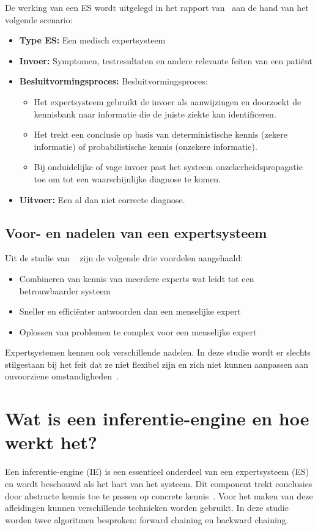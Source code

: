 De werking van een ES wordt uitgelegd in het rapport van~\textcite{Castillo2012} aan de hand van het volgende scenario:
\begin{itemize}
    \item \textbf{Type ES:} Een medisch expertsysteem
    \item \textbf{Invoer:} Symptomen, testresultaten en andere relevante feiten van een patiënt
    \item \textbf{Besluitvormingsproces:}
    {Besluitvormingsproces:}
    \begin{itemize}
        \item Het expertsysteem gebruikt de invoer als aanwijzingen en doorzoekt de kennisbank naar informatie die de juiste ziekte kan identificeren.
        \item Het trekt een conclusie op basis van deterministische kennis (zekere informatie) of probabilistische kennis (onzekere informatie).
        \item Bij onduidelijke of vage invoer past het systeem onzekerheidspropagatie toe om tot een waarschijnlijke diagnose te komen.
        \end{itemize}
    \item \textbf{Uitvoer:} Een al dan niet correcte diagnose.
\end{itemize}

\subsection{Voor- en nadelen van een expertsysteem}
Uit de studie van ~\textcite{Castillo2012} zijn de volgende drie voordelen aangehaald:
\begin{itemize}
    \item {Combineren van kennis van meerdere experts wat leidt tot een betrouwbaarder systeem}
    \item {Sneller en efficiënter antwoorden dan een menselijke expert}
    \item {Oplossen van problemen te complex voor een menselijke expert}
\end{itemize}

Expertsystemen kennen ook verschillende nadelen. In deze studie wordt er slechts stilgestaan bij het feit dat ze niet flexibel zijn en zich niet kunnen aanpassen aan onvoorziene omstandigheden~\autocite{Turban1988}.

\section{Wat is een inferentie-engine en hoe werkt het?}
Een inferentie-engine (IE) is een essentieel onderdeel van een expertsysteem (ES) en wordt beschouwd als het hart van het systeem. Dit component trekt conclusies door abstracte kennis toe te passen op concrete kennis~\autocite{Castillo2012}. Voor het maken van deze afleidingen kunnen verschillende technieken worden gebruikt. In deze studie worden twee algoritmen besproken: forward chaining en backward chaining.

